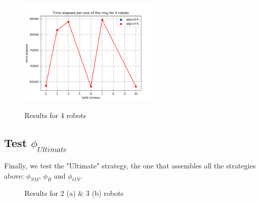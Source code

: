 \documentclass{article}
\begin{document}
\begin{figure}[!h]
    \centering
    \includegraphics[width=0.6\textwidth]{../data/data-phiR24/compar_phiR24_4.png}\label{phiR24r4}
    \caption{Results for 4 robots}
\end{figure}

\FloatBarrier

\subsection{Test $\phi_{Ultimate}$}

Finally, we test the "Ultimate" strategy, the one that assembles all the strategies above: $\phi_{SM}$, $\phi_{R}$ and $\phi_{ON}$.

\begin{figure}[!ht]
    \centering
    \caption{Results for 2 (a) \& 3 (b) robots}
\end{figure}
\end{document}
